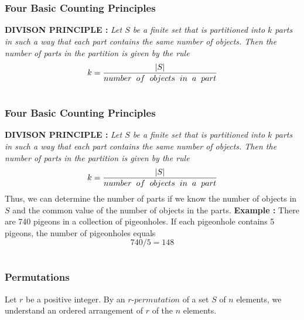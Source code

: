 \documentclass{beamer}
\begin{document}
 \section{}
 \begin{frame}
\frametitle{Four Basic Counting Principles}
{\Large \bf  DIVISON PRINCIPLE :}
{\it Let $S$ be a finite set that is partitioned into $k$ parts in such a way that each part contains the same number of objects. Then the number of parts in the partition is given by the rule \\
                                               $$k = \frac{|S|}{ number \hspace{.2cm} of \hspace{.2cm}objects\hspace{.2cm} in\hspace{.2cm} a\hspace{.2cm} part }$$}
\end{frame}


 \section{}
 \begin{frame}
\frametitle{Four Basic Counting Principles}
{\Large \bf  DIVISON PRINCIPLE :}
 {\it Let $S$ be a finite set that is partitioned into $k$ parts in such a way that each part contains the same number of objects. Then the number of parts in the partition is given by the rule \\
                                               $$k = \frac{|S|}{ number \hspace{.2cm} of \hspace{.2cm}objects\hspace{.2cm} in\hspace{.2cm} a\hspace{.2cm} part }$$}
 Thus, we can determine the number of parts if we know the number of objects in $S$
 and the common value of the number of objects in the parts.{\vspace{1cm}}
 {\bf Example : } There are 740 pigeons in a collection of pigeonholes. If each pigeonhole contains 5 pigeons, the number of pigeonholes equals\\
                                             $$740/5 =148$$
\end{frame}

\section{}
 \begin{frame}
\frametitle{Permutations}
Let  $r$ be a positive integer. By an $r$-$permutation$ of a set $S$ of $ n$ elements, we understand an ordered arrangement of $ r$ of the $n$ elements.
\end{frame}
\end{document}

